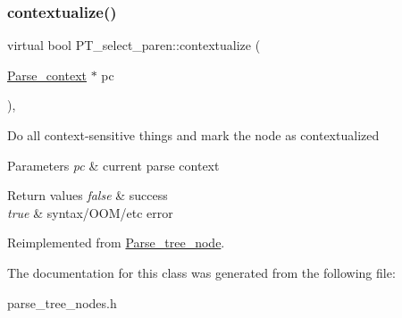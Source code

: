 \subsubsection{\texorpdfstring{contextualize()}{contextualize()}}
{\footnotesize\ttfamily virtual bool P\+T\+\_\+select\+\_\+paren\+::contextualize (\begin{DoxyParamCaption}\item[{\mbox{\hyperlink{structParse__context}{Parse\+\_\+context}} $\ast$}]{pc }\end{DoxyParamCaption})\hspace{0.3cm}{\ttfamily [inline]}, {\ttfamily [virtual]}}

Do all context-\/sensitive things and mark the node as contextualized


\begin{DoxyParams}{Parameters}
{\em pc} & current parse context\\
\hline
\end{DoxyParams}

\begin{DoxyRetVals}{Return values}
{\em false} & success \\
\hline
{\em true} & syntax/\+O\+O\+M/etc error \\
\hline
\end{DoxyRetVals}


Reimplemented from \mbox{\hyperlink{classParse__tree__node_a22d93524a537d0df652d7efa144f23da}{Parse\+\_\+tree\+\_\+node}}.



The documentation for this class was generated from the following file\+:\begin{DoxyCompactItemize}
\item 
parse\+\_\+tree\+\_\+nodes.\+h\end{DoxyCompactItemize}
